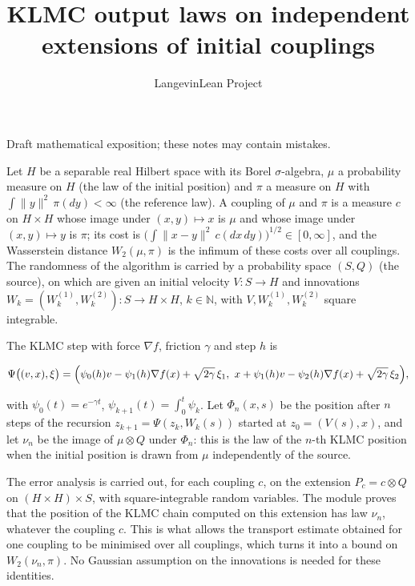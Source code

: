 \documentclass[11pt,a4paper]{article}
\title{\texorpdfstring{KLMC output laws on independent extensions of initial couplings}{KLMC output laws on independent extensions of initial couplings}}
\author{LangevinLean Project}
\date{}
\begin{document}
\maketitle
Draft mathematical exposition; these notes may contain mistakes.


Let \(H\) be a separable real Hilbert space with its Borel \(\sigma\)-algebra, \(\mu\) a probability measure on \(H\) (the law of the initial position) and \(\pi\) a measure on \(H\) with \(\int\|y\|^2\,\pi(dy)<\infty\) (the reference law). A coupling of \(\mu\) and \(\pi\) is a measure \(c\) on \(H\times H\) whose image under \((x,y)\mapsto x\) is \(\mu\) and whose image under \((x,y)\mapsto y\) is \(\pi\); its cost is \(\bigl(\int\|x-y\|^2\,c(dx\,dy)\bigr)^{1/2}\in[0,\infty]\), and the Wasserstein distance \(W_2(\mu,\pi)\) is the infimum of these costs over all couplings. The randomness of the algorithm is carried by a probability space \((S,Q)\) (the source), on which are given an initial velocity \(V:S\to H\) and innovations \(W_k=(W_k^{(1)},W_k^{(2)}):S\to H\times H\), \(k\in\mathbb N\), with \(V,W_k^{(1)},W_k^{(2)}\) square integrable.




The KLMC step with force \(\nabla f\), friction \(\gamma\) and step \(h\) is


\[\Psi\bigl((v,x),\xi\bigr)=\Bigl(\psi_0(h)v-\psi_1(h)\nabla f(x)+\sqrt{2\gamma}\,\xi_1,\ x+\psi_1(h)v-\psi_2(h)\nabla f(x)+\sqrt{2\gamma}\,\xi_2\Bigr),\]


with \(\psi_0(t)=e^{-\gamma t}\), \(\psi_{k+1}(t)=\int_0^t\psi_k\). Let \(\Phi_n(x,s)\) be the position after \(n\) steps of the recursion \(z_{k+1}=\Psi(z_k,W_k(s))\) started at \(z_0=(V(s),x)\), and let \(\nu_n\) be the image of \(\mu\otimes Q\) under \(\Phi_n\): this is the law of the \(n\)-th KLMC position when the initial position is drawn from \(\mu\) independently of the source.




The error analysis is carried out, for each coupling \(c\), on the extension \(P_c=c\otimes Q\) on \((H\times H)\times S\), with square-integrable random variables. The module proves that the position of the KLMC chain computed on this extension has law \(\nu_n\), whatever the coupling \(c\). This is what allows the transport estimate obtained for one coupling to be minimised over all couplings, which turns it into a bound on \(W_2(\nu_n,\pi)\). No Gaussian assumption on the innovations is needed for these identities.
\end{document}
